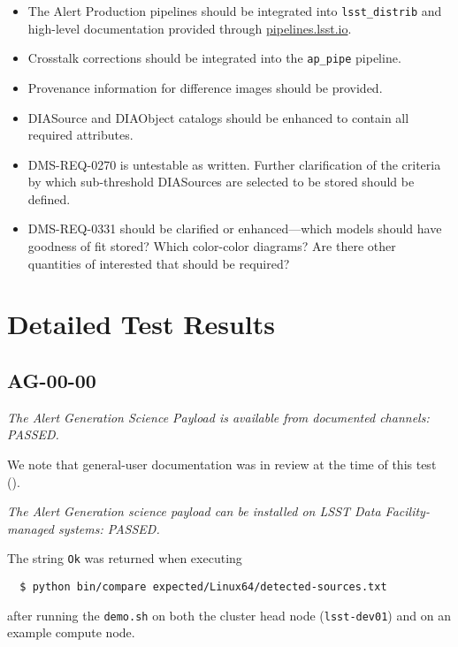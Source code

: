 \documentclass[DM,lsstdraft,STR,toc]{lsstdoc}
\begin{document}
\begin{itemize}

	\item{The Alert Production pipelines should be integrated into \texttt{lsst\_distrib} and high-level documentation provided through \url{pipelines.lsst.io}.}

	\item{Crosstalk corrections should be integrated into the \texttt{ap\_pipe} pipeline.}
	\item{Provenance information for difference images should be provided.}
	\item{DIASource and DIAObject catalogs should be enhanced to contain all required attributes.}
	\item{DMS-REQ-0270 is untestable as written.  
		Further clarification of the criteria by which sub-threshold 
		DIASources are selected to be stored should be defined.}
	\item{DMS-REQ-0331 should be clarified or enhanced---which models should have goodness of fit stored?  Which color-color diagrams?  Are there other quantities of interested that should be required?}

\end{itemize}

\section{Detailed Test Results}
\label{sect:detailed}

\subsection{AG-00-00}

\textit{The Alert Generation Science Payload is available from documented channels: PASSED.}

We note that general-user documentation was in review at the time of this test ().

\textit{The Alert Generation science payload can be installed on LSST Data Facility-managed systems: PASSED.}

The string \texttt{Ok} was returned when executing

\begin{verbatim}
  $ python bin/compare expected/Linux64/detected-sources.txt
\end{verbatim}

after running the \texttt{demo.sh} on both the cluster head node (\texttt{lsst-dev01}) and on an example compute node.
\end{document}
